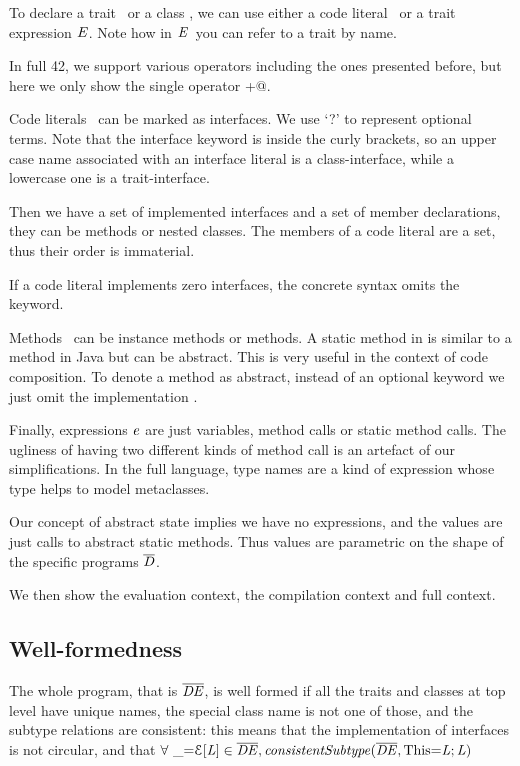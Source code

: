 \noindent To declare a trait \mTD\ or a class \mCD, we can use either a code literal \mL\ or a trait
expression $\mathit{E}$.
Note how in $\mathit{E}$\ you can refer to a trait by name.

 In full 42, we support various operators including the ones presented before,
 but here we only show the single operator \Q@+@.


Code literals \mL\ can be marked as interfaces. We use `?' to represent optional terms.
Note that the interface keyword is inside the curly brackets,
so an upper case name associated with an interface literal is a class-interface, while a lowercase one is a trait-interface.

Then we have a set of implemented interfaces and a set of member
declarations, they can be methods or nested classes.
The members of a code literal are a set, thus their order is immaterial.

\noindent If a code literal implements zero interfaces, the concrete syntax omits the \Q@implements@ keyword.

Methods \mMD~can be instance methods or \Q@static@ methods. 
A static method in \name is similar to a \Q@static@ method in Java but can be abstract.
This is very useful in the context of code composition.
To denote a method as abstract, instead of an optional keyword we just omit the implementation \me.

Finally, expressions $\mathit{e}$ are just variables, method calls or static method calls.
The ugliness of having two different kinds of method call is an artefact of our simplifications.
In the full language, type names are a kind of expression whose type helps to model metaclasses.

Our concept of abstract state implies we have no \Q@new@ expressions, and
the values are just calls to abstract static methods.
Thus values are parametric on the shape of the specific programs $\overline{\mathit{D}}$.

We then show the evaluation context, the compilation context and full context.

\subsection{Well-formedness}

The whole program, that is $\overline{\mathit{DE}}$, is well formed if
all the traits and classes at top level have unique names, the special class name
\Q@This@ is not one of those,
and the subtype relations are consistent:
this means that the implementation of interfaces is not circular,
and that $\forall\ \_\terminalCode{=}\ctx[\mL]\in\overline\mDE, \mathit{consistentSubtype}(\overline\mDE,\terminalCode{This=}\mL;\mL)$

